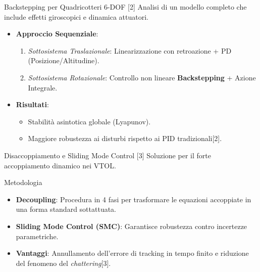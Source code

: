 \documentclass[aspectratio=169]{beamer}
\begin{document}
\begin{frame}{Backstepping per Quadricotteri 6-DOF [2]}
    Analisi di un modello completo che include effetti giroscopici e dinamica attuatori.
    \vspace{0.3cm}
    \begin{itemize}
        \item \textbf{Approccio Sequenziale}:
        \begin{enumerate}
            \item \textit{Sottosistema Traslazionale}: Linearizzazione con retroazione + PD (Posizione/Altitudine).
            \item \textit{Sottosistema Rotazionale}: Controllo non lineare \textbf{Backstepping} + Azione Integrale.
        \end{enumerate}
        \item \textbf{Risultati}:
        \begin{itemize}
            \item Stabilità asintotica globale (Lyapunov).
            \item Maggiore robustezza ai disturbi rispetto ai PID tradizionali[2].
        \end{itemize}
    \end{itemize}
\end{frame}

\begin{frame}{Disaccoppiamento e Sliding Mode Control [3]}
    Soluzione per il forte accoppiamento dinamico nei VTOL.
    \vspace{0.3cm}
    \begin{block}{Metodologia}
        \begin{itemize}
            \item \textbf{Decoupling}: Procedura in 4 fasi per trasformare le equazioni accoppiate in una forma standard sottattuata.
            \item \textbf{Sliding Mode Control (SMC)}: Garantisce robustezza contro incertezze parametriche.
        \end{itemize}
    \end{block}
    \begin{itemize}
        \item \textbf{Vantaggi}: Annullamento dell'errore di tracking in tempo finito e riduzione del fenomeno del \textit{chattering}[3].
    \end{itemize}
\end{frame}
\end{document}
